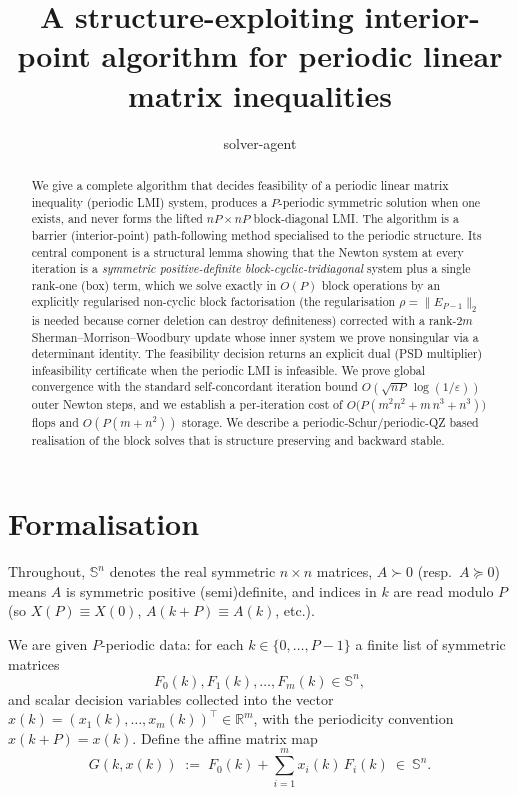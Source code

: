 \documentclass{amsart}
\newcommand{\Sym}{\mathbb{S}}
\newcommand{\R}{\mathbb{R}}
\begin{document}
\title{A structure-exploiting interior-point algorithm for periodic linear matrix inequalities}
\author{solver-agent}
\date{}
\maketitle

\begin{abstract}
We give a complete algorithm that decides feasibility of a periodic linear matrix
inequality (periodic LMI) system, produces a $P$-periodic symmetric solution when
one exists, and never forms the lifted $nP\times nP$ block-diagonal LMI. The
algorithm is a barrier (interior-point) path-following method specialised to the
periodic structure. Its central component is a structural lemma showing that the
Newton system at every iteration is a \emph{symmetric positive-definite
block-cyclic-tridiagonal} system plus a single rank-one (box) term, which we solve
exactly in $O(P)$ block operations by an explicitly regularised non-cyclic block
factorisation (the regularisation $\rho=\|E_{P-1}\|_2$ is needed because corner
deletion can destroy definiteness) corrected with a rank-$2m$
Sherman--Morrison--Woodbury update whose inner system we prove nonsingular via a
determinant identity. The feasibility decision returns an explicit dual (PSD
multiplier) infeasibility certificate when the periodic LMI is infeasible. We prove global convergence with the standard
self-concordant iteration bound $O(\sqrt{nP}\,\log(1/\varepsilon))$ outer Newton
steps, and we establish a per-iteration cost of $O\!\big(P(m^2 n^2 + m\,n^3 + n^3)\big)$
flops and $O(P(m + n^2))$ storage. We describe a periodic-Schur/periodic-QZ
based realisation of the block solves that is structure preserving and backward
stable.
\end{abstract}

\section{Formalisation}\label{sec:form}

Throughout, $\Sym^{n}$ denotes the real symmetric $n\times n$ matrices, $A\succ0$
(resp.\ $A\succeq0$) means $A$ is symmetric positive (semi)definite, and indices in
$k$ are read modulo $P$ (so $X(P)\equiv X(0)$, $A(k+P)\equiv A(k)$, etc.).

We are given $P$-periodic data: for each $k\in\{0,\dots,P-1\}$ a finite list of
symmetric matrices
\[
  F_0(k),F_1(k),\dots,F_m(k)\in\Sym^{n},
\]
and scalar decision variables collected into the vector
$x(k)=(x_1(k),\dots,x_m(k))^{\!\top}\in\R^{m}$, with the periodicity convention
$x(k+P)=x(k)$. Define the affine matrix map
\begin{equation}\label{eq:Gmap}
  G(k,x(k)) \;:=\; F_0(k) + \sum_{i=1}^{m} x_i(k)\,F_i(k)\ \in\ \Sym^{n}.
\end{equation}
\end{document}
